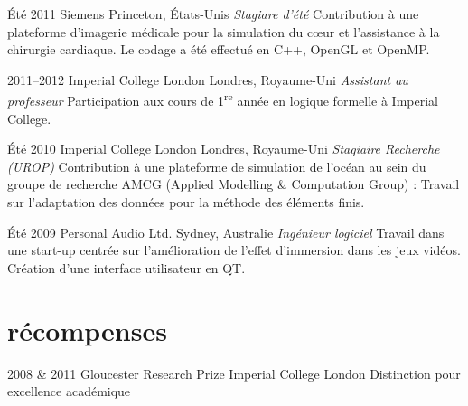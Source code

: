 \documentclass[]{friggeri-cv} %
\begin{document}
\begin{entrylist}

\entry
{Été 2011}
{Siemens}
{Princeton, États-Unis}
{\emph{Stagiare d'été}
\medbreak
Contribution à une plateforme d’imagerie médicale pour la simulation du cœur et
l’assistance à la chirurgie cardiaque. Le codage a été effectué
en C++, OpenGL et OpenMP.
\bigbreak
}

\entry
{2011--2012}
{Imperial College London}
{Londres, Royaume-Uni}
{\emph{Assistant au professeur}
\medbreak
    Participation aux cours de 1\textsuperscript{re} année en logique formelle à Imperial College.
\bigbreak
}

\entry
{Été 2010}
{Imperial College London}
{Londres, Royaume-Uni}
    {\emph{Stagiaire Recherche (UROP)}
	\medbreak
    Contribution à une plateforme de simulation de l’océan au sein du groupe
    de recherche AMCG (Applied Modelling \& Computation Group) : Travail 
    sur l'adaptation des données pour la méthode des éléments finis.
	\bigbreak
}

\entry
{Été 2009}
{Personal Audio Ltd.}
{Sydney, Australie}
    {\emph{Ingénieur logiciel}
	\medbreak
    Travail dans une start-up centrée sur l’amélioration de l’effet d'immersion dans les
    jeux vidéos. Création d’une interface utilisateur en QT.
	\bigbreak
}


\end{entrylist}


\section{récompenses}

\begin{entrylist}


\entry
{2008 \& 2011}
{Gloucester Research Prize}
{Imperial College London}
{Distinction pour excellence académique}


\end{entrylist}


\end{document}
